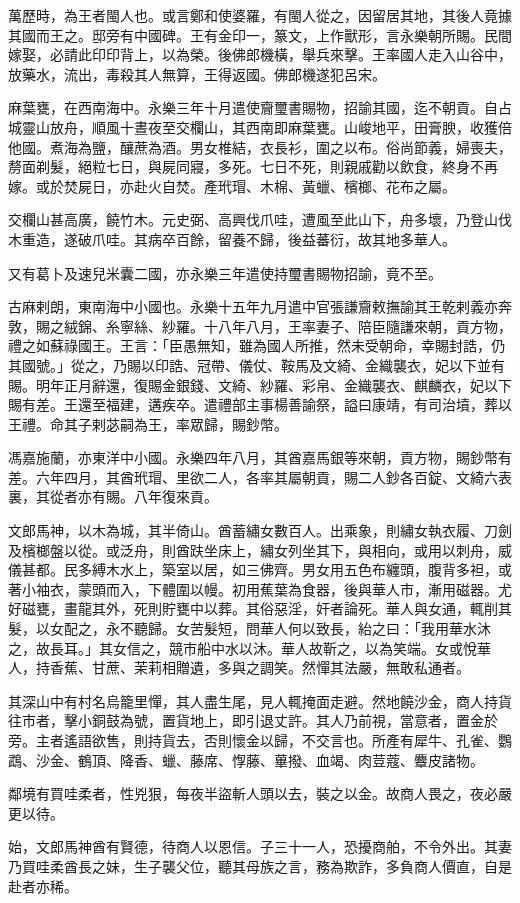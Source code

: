 \begin{pinyinscope}
萬歷時，為王者閩人也。或言鄭和使婆羅，有閩人從之，因留居其地，其後人竟據其國而王之。邸旁有中國碑。王有金印一，篆文，上作獸形，言永樂朝所賜。民間嫁娶，必請此印印背上，以為榮。後佛郎機橫，舉兵來擊。王率國人走入山谷中，放藥水，流出，毒殺其人無算，王得返國。佛郎機遂犯呂宋。

麻葉甕，在西南海中。永樂三年十月遣使齎璽書賜物，招諭其國，迄不朝貢。自占城靈山放舟，順風十晝夜至交欄山，其西南即麻葉甕。山峻地平，田膏腴，收獲倍他國。煮海為鹽，釀蔗為酒。男女椎結，衣長衫，圍之以布。俗尚節義，婦喪夫，剺面剃髮，絕粒七日，與屍同寢，多死。七日不死，則親戚勸以飲食，終身不再嫁。或於焚屍日，亦赴火自焚。產玳瑁、木棉、黃蠟、檳榔、花布之屬。

交欄山甚高廣，饒竹木。元史弼、高興伐爪哇，遭風至此山下，舟多壞，乃登山伐木重造，遂破爪哇。其病卒百餘，留養不歸，後益蕃衍，故其地多華人。

又有葛卜及速兒米囊二國，亦永樂三年遣使持璽書賜物招諭，竟不至。

古麻剌朗，東南海中小國也。永樂十五年九月遣中官張謙齎敕撫諭其王乾剌義亦奔敦，賜之絨錦、糸寧絲、紗羅。十八年八月，王率妻子、陪臣隨謙來朝，貢方物，禮之如蘇祿國王。王言：「臣愚無知，雖為國人所推，然未受朝命，幸賜封誥，仍其國號。」從之，乃賜以印誥、冠帶、儀仗、鞍馬及文綺、金織襲衣，妃以下並有賜。明年正月辭還，復賜金銀錢、文綺、紗羅、彩帛、金織襲衣、麒麟衣，妃以下賜有差。王還至福建，遘疾卒。遣禮部主事楊善諭祭，謚曰康靖，有司治墳，葬以王禮。命其子剌苾嗣為王，率眾歸，賜鈔幣。

馮嘉施蘭，亦東洋中小國。永樂四年八月，其酋嘉馬銀等來朝，貢方物，賜鈔幣有差。六年四月，其酋玳瑁、里欲二人，各率其屬朝貢，賜二人鈔各百錠、文綺六表裏，其從者亦有賜。八年復來貢。

文郎馬神，以木為城，其半倚山。酋蓄繡女數百人。出乘象，則繡女執衣履、刀劍及檳榔盤以從。或泛舟，則酋趺坐床上，繡女列坐其下，與相向，或用以刺舟，威儀甚都。民多縛木水上，築室以居，如三佛齊。男女用五色布纏頭，腹背多袒，或著小袖衣，蒙頭而入，下體圍以幔。初用蕉葉為食器，後與華人市，漸用磁器。尤好磁甕，畫龍其外，死則貯甕中以葬。其俗惡淫，奸者論死。華人與女通，輒削其髮，以女配之，永不聽歸。女苦髮短，問華人何以致長，紿之曰：「我用華水沐之，故長耳。」其女信之，競市船中水以沐。華人故靳之，以為笑端。女或悅華人，持香蕉、甘蔗、茉莉相贈遺，多與之調笑。然憚其法嚴，無敢私通者。

其深山中有村名烏籠里憚，其人盡生尾，見人輒掩面走避。然地饒沙金，商人持貨往市者，擊小銅鼓為號，置貨地上，即引退丈許。其人乃前視，當意者，置金於旁。主者遙語欲售，則持貨去，否則懷金以歸，不交言也。所產有犀牛、孔雀、鸚鵡、沙金、鶴頂、降香、蠟、藤席、惸藤、蓽撥、血竭、肉荳蔻、麞皮諸物。

鄰境有買哇柔者，性兇狠，每夜半盜斬人頭以去，裝之以金。故商人畏之，夜必嚴更以待。

始，文郎馬神酋有賢德，待商人以恩信。子三十一人，恐擾商舶，不令外出。其妻乃買哇柔酋長之妹，生子襲父位，聽其母族之言，務為欺詐，多負商人價直，自是赴者亦稀。


\end{pinyinscope}